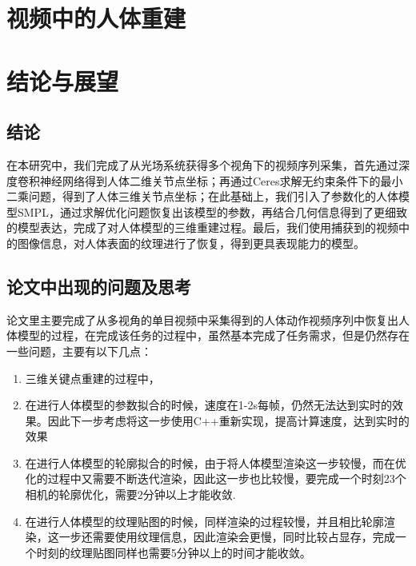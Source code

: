 











\section{视频中的人体重建}

\section{结论与展望}
\subsection{结论}
在本研究中，我们完成了从光场系统获得多个视角下的视频序列采集，首先通过深度卷积神经网络得到人体二维关节点坐标；再通过Ceres求解无约束条件下的最小二乘问题，得到了人体三维关节点坐标；在此基础上，我们引入了参数化的人体模型SMPL，通过求解优化问题恢复出该模型的参数，再结合几何信息得到了更细致的模型表达，完成了对人体模型的三维重建过程。最后，我们使用捕获到的视频中的图像信息，对人体表面的纹理进行了恢复，得到更具表现能力的模型。

\subsection{论文中出现的问题及思考}
论文里主要完成了从多视角的单目视频中采集得到的人体动作视频序列中恢复出人体模型的过程，在完成该任务的过程中，虽然基本完成了任务需求，但是仍然存在一些问题，主要有以下几点：
\begin{enumerate}
    \item 三维关键点重建的过程中，
    \item 在进行人体模型的参数拟合的时候，速度在1-2s每帧，仍然无法达到实时的效果。因此下一步考虑将这一步使用C++重新实现，提高计算速度，达到实时的效果
    \item 在进行人体模型的轮廓拟合的时候，由于将人体模型渲染这一步较慢，而在优化的过程中又需要不断迭代渲染，因此这一步也比较慢，要完成一个时刻23个相机的轮廓优化，需要2分钟以上才能收敛.
    \item 在进行人体模型的纹理贴图的时候，同样渲染的过程较慢，并且相比轮廓渲染，这一步还需要使用纹理信息，因此渲染会更慢，同时比较占显存，完成一个时刻的纹理贴图同样也需要5分钟以上的时间才能收敛。
\end{enumerate}



